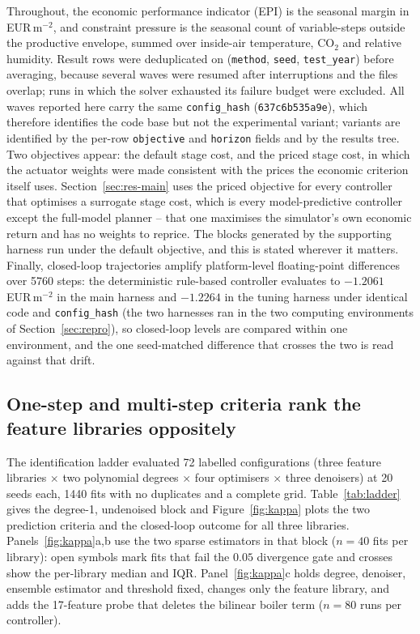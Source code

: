 Throughout, the economic performance indicator (EPI) is the seasonal margin in
EUR\,m$^{-2}$, and constraint pressure is the seasonal count of variable-steps outside the
productive envelope, summed over inside-air temperature, CO$_2$ and relative humidity. Result rows were deduplicated on
(\texttt{method}, \texttt{seed}, \texttt{test\_year}) before averaging, because several
waves were resumed after interruptions and the files overlap; runs in which the solver
exhausted its failure budget were excluded. All waves reported here carry the same
\texttt{config\_hash} (\texttt{637c6b535a9e}), which therefore identifies the code base but
not the experimental variant; variants are identified by the per-row
\texttt{objective} and \texttt{horizon} fields and by the results tree. Two objectives
appear: the default stage cost, and the priced stage cost, in which the actuator
weights were made consistent with the prices the economic criterion itself uses.
Section~\ref{sec:res-main} uses the priced objective for every controller that optimises a
surrogate stage cost, which is every model-predictive controller except the full-model
planner -- that one maximises the simulator's own economic return and has no weights to
reprice. The blocks generated by the supporting harness run under the default objective,
and this is stated wherever it matters. Finally, closed-loop trajectories
amplify platform-level floating-point differences over 5760 steps: the deterministic
rule-based controller evaluates to $-1.2061$ EUR\,m$^{-2}$ in the main harness and
$-1.2264$ in the tuning harness under identical code and \texttt{config\_hash} (the two
harnesses ran in the two computing environments of Section~\ref{sec:repro}), so
closed-loop levels are compared within one environment, and the one seed-matched
difference that crosses the two is read against that drift.

\subsection{One-step and multi-step criteria rank the feature libraries oppositely}
\label{sec:res-ladder}

The identification ladder evaluated 72 labelled configurations (three feature libraries
$\times$ two polynomial degrees $\times$ four optimisers $\times$ three denoisers) at 20
seeds each, 1440 fits with no duplicates and a complete grid. Table~\ref{tab:ladder}
gives the degree-1, undenoised block and Figure~\ref{fig:kappa} plots the two prediction
criteria and the closed-loop outcome for all three libraries.
Panels~\ref{fig:kappa}a,b use the two sparse estimators in that block ($n=40$ fits per
library): open symbols mark fits that fail the $0.05$ divergence gate and crosses show the
per-library median and IQR. Panel~\ref{fig:kappa}c holds degree, denoiser, ensemble
estimator and threshold fixed, changes only the feature library, and adds the 17-feature
probe that deletes the bilinear boiler term ($n=80$ runs per controller).

